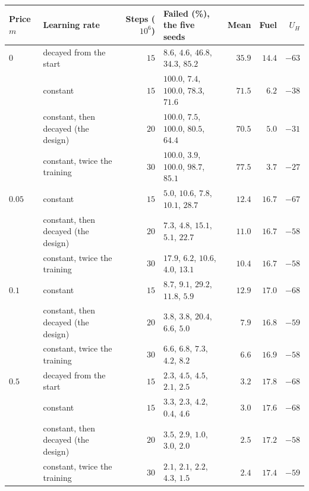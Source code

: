 \begin{tabular}{llrlrrr}
\toprule
Price $m$ & Learning rate & Steps ($10^6$) & Failed (\%), the five seeds & Mean & Fuel & $U_H$ \\
\midrule
$0$ & decayed from the start & $15$ & $8.6$, $4.6$, $46.8$, $34.3$, $85.2$ & $35.9$ & $14.4$ & $-63$ \\
 & constant & $15$ & $100.0$, $7.4$, $100.0$, $78.3$, $71.6$ & $71.5$ & $6.2$ & $-38$ \\
 & constant, then decayed (the design) & $20$ & $100.0$, $7.5$, $100.0$, $80.5$, $64.4$ & $70.5$ & $5.0$ & $-31$ \\
 & constant, twice the training & $30$ & $100.0$, $3.9$, $100.0$, $98.7$, $85.1$ & $77.5$ & $3.7$ & $-27$ \\
\addlinespace
$0.05$ & constant & $15$ & $5.0$, $10.6$, $7.8$, $10.1$, $28.7$ & $12.4$ & $16.7$ & $-67$ \\
 & constant, then decayed (the design) & $20$ & $7.3$, $4.8$, $15.1$, $5.1$, $22.7$ & $11.0$ & $16.7$ & $-58$ \\
 & constant, twice the training & $30$ & $17.9$, $6.2$, $10.6$, $4.0$, $13.1$ & $10.4$ & $16.7$ & $-58$ \\
\addlinespace
$0.1$ & constant & $15$ & $8.7$, $9.1$, $29.2$, $11.8$, $5.9$ & $12.9$ & $17.0$ & $-68$ \\
 & constant, then decayed (the design) & $20$ & $3.8$, $3.8$, $20.4$, $6.6$, $5.0$ & $7.9$ & $16.8$ & $-59$ \\
 & constant, twice the training & $30$ & $6.6$, $6.8$, $7.3$, $4.2$, $8.2$ & $6.6$ & $16.9$ & $-58$ \\
\addlinespace
$0.5$ & decayed from the start & $15$ & $2.3$, $4.5$, $4.5$, $2.1$, $2.5$ & $3.2$ & $17.8$ & $-68$ \\
 & constant & $15$ & $3.3$, $2.3$, $4.2$, $0.4$, $4.6$ & $3.0$ & $17.6$ & $-68$ \\
 & constant, then decayed (the design) & $20$ & $3.5$, $2.9$, $1.0$, $3.0$, $2.0$ & $2.5$ & $17.2$ & $-58$ \\
 & constant, twice the training & $30$ & $2.1$, $2.1$, $2.2$, $4.3$, $1.5$ & $2.4$ & $17.4$ & $-59$ \\
\bottomrule
\end{tabular}
